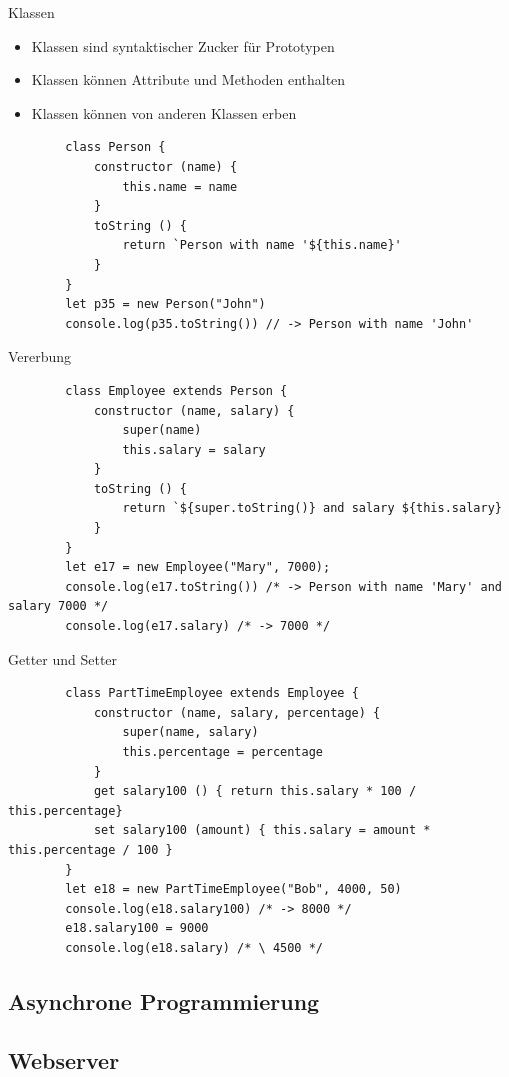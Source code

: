 \begin{code}{Klassen}
    \begin{itemize}
        \item Klassen sind syntaktischer Zucker für Prototypen
        \item Klassen können Attribute und Methoden enthalten
        \item Klassen können von anderen Klassen erben
    \end{itemize}

    \begin{verbatim}
        class Person {
            constructor (name) {
                this.name = name
            }
            toString () {
                return `Person with name '${this.name}'
            }
        }
        let p35 = new Person("John")
        console.log(p35.toString()) // -> Person with name 'John'
        \end{verbatim}
\end{code}

\begin{code}{Vererbung}
    \begin{verbatim}
        class Employee extends Person {
            constructor (name, salary) {
                super(name)
                this.salary = salary
            }
            toString () {
                return `${super.toString()} and salary ${this.salary}
            }
        }
        let e17 = new Employee("Mary", 7000);
        console.log(e17.toString()) /* -> Person with name 'Mary' and salary 7000 */
        console.log(e17.salary) /* -> 7000 */
        \end{verbatim}
\end{code}

\begin{code}{Getter und Setter}
    \begin{verbatim}
        class PartTimeEmployee extends Employee {
            constructor (name, salary, percentage) {
                super(name, salary)
                this.percentage = percentage
            }
            get salary100 () { return this.salary * 100 / this.percentage}
            set salary100 (amount) { this.salary = amount * this.percentage / 100 }
        }
        let e18 = new PartTimeEmployee("Bob", 4000, 50)
        console.log(e18.salary100) /* -> 8000 */
        e18.salary100 = 9000
        console.log(e18.salary) /* \ 4500 */
        \end{verbatim}
\end{code}

\subsection{Asynchrone Programmierung}

\subsection{Webserver}
